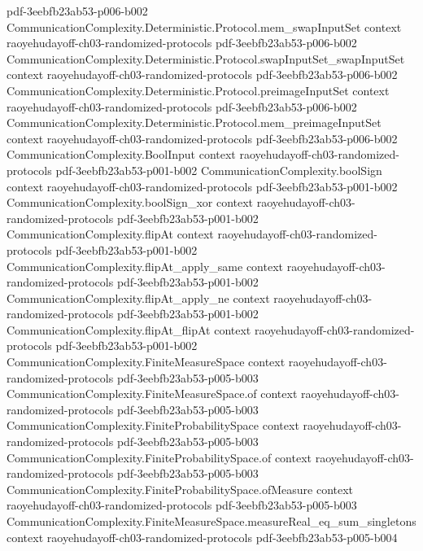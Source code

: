 \begin{theorem}
  {pdf-3eebfb23ab53-p006-b002}
\proofstep
  {CommunicationComplexity.Deterministic.Protocol.mem_swapInputSet}
  {context}
  {raoyehudayoff-ch03-randomized-protocols}
  {pdf-3eebfb23ab53-p006-b002}
\proofstep
  {CommunicationComplexity.Deterministic.Protocol.swapInputSet_swapInputSet}
  {context}
  {raoyehudayoff-ch03-randomized-protocols}
  {pdf-3eebfb23ab53-p006-b002}
\proofstep
  {CommunicationComplexity.Deterministic.Protocol.preimageInputSet}
  {context}
  {raoyehudayoff-ch03-randomized-protocols}
  {pdf-3eebfb23ab53-p006-b002}
\proofstep
  {CommunicationComplexity.Deterministic.Protocol.mem_preimageInputSet}
  {context}
  {raoyehudayoff-ch03-randomized-protocols}
  {pdf-3eebfb23ab53-p006-b002}
\proofstep
  {CommunicationComplexity.BoolInput}
  {context}
  {raoyehudayoff-ch03-randomized-protocols}
  {pdf-3eebfb23ab53-p001-b002}
\proofstep
  {CommunicationComplexity.boolSign}
  {context}
  {raoyehudayoff-ch03-randomized-protocols}
  {pdf-3eebfb23ab53-p001-b002}
\proofstep
  {CommunicationComplexity.boolSign_xor}
  {context}
  {raoyehudayoff-ch03-randomized-protocols}
  {pdf-3eebfb23ab53-p001-b002}
\proofstep
  {CommunicationComplexity.flipAt}
  {context}
  {raoyehudayoff-ch03-randomized-protocols}
  {pdf-3eebfb23ab53-p001-b002}
\proofstep
  {CommunicationComplexity.flipAt_apply_same}
  {context}
  {raoyehudayoff-ch03-randomized-protocols}
  {pdf-3eebfb23ab53-p001-b002}
\proofstep
  {CommunicationComplexity.flipAt_apply_ne}
  {context}
  {raoyehudayoff-ch03-randomized-protocols}
  {pdf-3eebfb23ab53-p001-b002}
\proofstep
  {CommunicationComplexity.flipAt_flipAt}
  {context}
  {raoyehudayoff-ch03-randomized-protocols}
  {pdf-3eebfb23ab53-p001-b002}
\proofstep
  {CommunicationComplexity.FiniteMeasureSpace}
  {context}
  {raoyehudayoff-ch03-randomized-protocols}
  {pdf-3eebfb23ab53-p005-b003}
\proofstep
  {CommunicationComplexity.FiniteMeasureSpace.of}
  {context}
  {raoyehudayoff-ch03-randomized-protocols}
  {pdf-3eebfb23ab53-p005-b003}
\proofstep
  {CommunicationComplexity.FiniteProbabilitySpace}
  {context}
  {raoyehudayoff-ch03-randomized-protocols}
  {pdf-3eebfb23ab53-p005-b003}
\proofstep
  {CommunicationComplexity.FiniteProbabilitySpace.of}
  {context}
  {raoyehudayoff-ch03-randomized-protocols}
  {pdf-3eebfb23ab53-p005-b003}
\proofstep
  {CommunicationComplexity.FiniteProbabilitySpace.ofMeasure}
  {context}
  {raoyehudayoff-ch03-randomized-protocols}
  {pdf-3eebfb23ab53-p005-b003}
\proofstep
  {CommunicationComplexity.FiniteMeasureSpace.measureReal_eq_sum_singletons}
  {context}
  {raoyehudayoff-ch03-randomized-protocols}
  {pdf-3eebfb23ab53-p005-b004}

\end{theorem}

